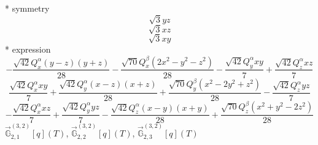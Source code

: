 \documentclass[fleqn,8pt]{jsarticle}
\begin{document}
\noindent\quad ** symmetry
\begin{dmath*}
\sqrt{3} y z
\end{dmath*}
\begin{dmath*}
\sqrt{3} x z
\end{dmath*}
\begin{dmath*}
\sqrt{3} x y
\end{dmath*}
\noindent\quad ** expression
\begin{dmath*}
- \frac{\sqrt{42} Q_{x}^{\alpha} \left(y - z\right) \left(y + z\right)}{28} - \frac{\sqrt{70} Q_{x}^{\beta} \left(2 x^{2} - y^{2} - z^{2}\right)}{28} - \frac{\sqrt{42} Q_{y}^{\alpha} x y}{7} + \frac{\sqrt{42} Q_{z}^{\alpha} x z}{7}
\end{dmath*}
\begin{dmath*}
\frac{\sqrt{42} Q_{x}^{\alpha} x y}{7} + \frac{\sqrt{42} Q_{y}^{\alpha} \left(x - z\right) \left(x + z\right)}{28} + \frac{\sqrt{70} Q_{y}^{\beta} \left(x^{2} - 2 y^{2} + z^{2}\right)}{28} - \frac{\sqrt{42} Q_{z}^{\alpha} y z}{7}
\end{dmath*}
\begin{dmath*}
- \frac{\sqrt{42} Q_{x}^{\alpha} x z}{7} + \frac{\sqrt{42} Q_{y}^{\alpha} y z}{7} - \frac{\sqrt{42} Q_{z}^{\alpha} \left(x - y\right) \left(x + y\right)}{28} + \frac{\sqrt{70} Q_{z}^{\beta} \left(x^{2} + y^{2} - 2 z^{2}\right)}{28}
\end{dmath*}
\noindent\quad $\vec{\mathbb{G}}_{2,1}^{(3,2)}[q](T)$, $\vec{\mathbb{G}}_{2,2}^{(3,2)}[q](T)$, $\vec{\mathbb{G}}_{2,3}^{(3,2)}[q](T)$
\end{document}
